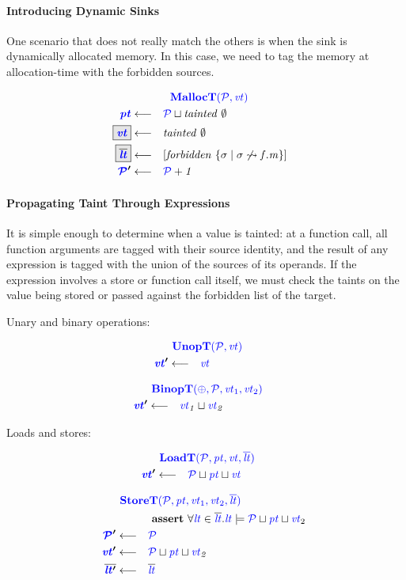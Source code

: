 \documentclass[acmsmall,review,anonymous]{acmart}\settopmatter{printfolios=true,printccs=false,printacmref=false}
\begin{document}
\paragraph{Introducing Dynamic Sinks}

One scenario that does not really match the others is when the sink is dynamically allocated
memory. In this case, we need to tag the memory at allocation-time with the forbidden
sources.

\[\begin{aligned}
\truledef{\malloct}
\settag{\pt}{\PCT \sqcup \mathit{tainted} ~ \emptyset}
\settagopt{\vt}{\mathit{tainted} ~ \emptyset}
\settagopt{\overline{\lt}}{\left[\mathit{forbidden} ~ \{\sigma \mid \sigma \not \rightsquigarrow f.m\} \right]}
\settag{\PCT'}{\PCT + 1}
\end{aligned}\]

\paragraph{Propagating Taint Through Expressions}

It is simple enough to determine when a value is tainted: at a function
call, all function arguments are tagged with their source identity, and the result
of any expression is tagged with the union of the sources of its operands. If the
expression involves a store or function call itself, we must check the taints on
the value being stored or passed against the forbidden list of the target.

Unary and binary operations:

\begin{minipage}[t]{.49\textwidth}
  \[\begin{aligned}
  \truledef{\unopt}
  \settag{\vt'}{\vt}
  \end{aligned}\]
\end{minipage}
\begin{minipage}[t]{.49\textwidth}
  \[\begin{aligned}
  \truledef{\binopt}
  \settag{\vt'}{
    \vt_1 \sqcup \vt_2
  }
  \end{aligned}\]
\end{minipage}

Loads and stores:

\begin{minipage}[t]{.4\textwidth}
\[\begin{aligned}
\truledef{\loadt}
\settag{\vt'}{\PCT \sqcup \pt \sqcup \vt}
\end{aligned}\]
\end{minipage}
\begin{minipage}[t]{.59\textwidth}
\[\begin{aligned}
\truledef{\storet}
\assert{\forall \lt \in \overline{\lt} . \lt \models \PCT \sqcup \pt \sqcup \vt_2}
\settag{\PCT'}{\PCT}
\settag{\vt'}{\PCT \sqcup \pt \sqcup \vt_2}
\settag{\overline{\lt'}}{\overline{\lt}}
\end{aligned}\]
\end{minipage}
\end{document}

